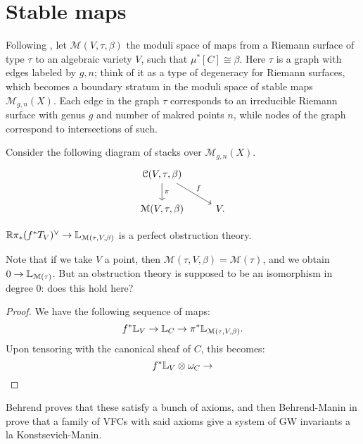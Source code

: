 \section{Stable maps}
Following \cite{bm_stacks}, let $\mathcal{M}(V,\tau,\beta)$ the moduli space of maps from a Riemann 
surface of type $\tau$ to an algebraic variety $V$,
such that $\mu^*[C] \cong \beta$. Here $\tau$ is a graph with edges labeled by $g,n$; think of it as a type of degeneracy
for Riemann surfaces, which becomes a boundary stratum in the moduli space of stable maps $\mathcal{M}_{g,n}(X)$. 
Each edge in the graph $\tau$ corresponds to an irreducible Riemann surface with genus $g$ 
and number of makred points $n$, while nodes of the graph correspond to intersections of such.

Consider the following diagram of stacks over $\mathcal{M}_{g,n}(X)$.
\[
\begin{tikzcd}
\mathcal{C}(V,\tau,\beta)\arrow{d}{\pi} \arrow{dr}{f} & \\ \mathcal{M}(V,\tau,\beta) & V .
\end{tikzcd}
\]

\begin{prop}
\label{prop:stable_maps_standard_obstruction}
$\mathbb R\pi_*(f^*T_V)^{\vee} \to \mathbb L_{\mathcal{M}(\tau,V,\beta)}$ is a perfect obstruction theory.
\end{prop}

\begin{rem}
Note that if we take
$V$ a point, then $\mathcal{M}(\tau,V,\beta) = \mathcal{M}(\tau)$, and we obtain $0 \to \mathbb L_{\mathcal{M}(\tau)}$.
But an obstruction theory is supposed to be an isomorphism in degree 0: does this hold here?
\end{rem}

\begin{proof}
We have the following sequence of maps:
\[	f^*\mathbb L_V \to \mathbb L_C \to \pi^* \mathbb L_{\mathcal{M}(\tau,V,\beta)}.	\]
Upon tensoring with the canonical sheaf of $C$, this becomes:
\[	f^*\mathbb L_V \otimes \omega_C \to	\]
\end{proof}

Behrend proves that these satisfy a bunch of axioms, and then Behrend-Manin in \cite{bm_stacks} prove that a 
family of VFCs with said axioms
give a system of GW invariants a la Konstsevich-Manin.

